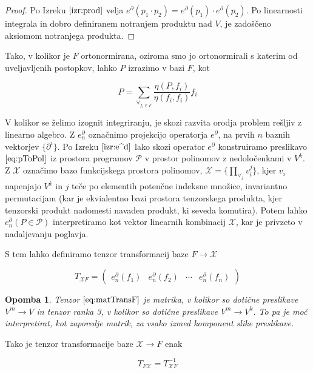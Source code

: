 \documentclass{article}
\newcommand{\X}{\mathcal{X}}
\newcommand{\dP}{\mathcal{P}}
\newcommand{\D}{\partial}
\newtheorem{opomba}{Opomba}[section]
\begin{document}
  \begin{proof}
  Po Izreku $\ref{izr:prod}$ velja $e^\D(p_1\cdot p_2)=e^\D(p_1)\cdot e^\D(p_2)$. Po linearnosti integrala in dobro definiranem notranjem produktu nad $V$, je zadoščeno aksiomom notranjega produkta.
  \end{proof}
  
  Tako, v kolikor je $F$ ortonormirana, oziroma smo jo ortonormirali s katerim od uveljavljenih postopkov, lahko $P$ izrazimo v bazi $F$, kot
  
  \begin{equation}
 	P=\sum\limits_{\forall_{f_i\in F}}\frac{\eta(P,f_i)}{\eta(f_i,f_i)}f_i
  \end{equation}
  
  V kolikor se želimo izognit integriranju, je skozi razvita orodja problem rešljiv z linearno algebro. Z $e_n^\D$ označnimo projekcijo operatorja $e^\D$, na prvih $n$ baznih vektorjev $\{\D^i\}$. Po Izreku $\ref{izr:e^d}$ lako skozi operator $e^\D$ konstruiramo preslikavo $\eqref{eq:pToPol}$ iz prostora programov $\dP$ v prostor polinomov z nedoločenkami v  $V^k$. Z $\X$ označimo bazo funkcijskega prostora polinomov, $\X=\{\prod\limits_{\forall_j} v_i^j\}$, kjer $v_i$ napenjajo $V^k$ in $j$ teče po elementih potenčne indeksne množice, invariantno permutacijam (kar je ekvialentno bazi prostora tenzorskega produkta, kjer tenzorski produkt nadomesti navaden produkt, ki seveda komutira). Potem lahko $e^\D_n(P\in\dP)$ interpretiramo kot vektor linearnih kombinacij $\X$, kar je privzeto v nadaljevanju poglavja.
  
  S tem lahko definiramo tenzor transformacij baze $F\to\X$
  
  \begin{equation}\label{eq:matTransF}
  T_{\X F}=\begin{pmatrix}
  e_n^\D(f_1) & e_n^\D(f_2) & \cdots & e_n^\D(f_n)
  \end{pmatrix}
  \end{equation}
  
  \begin{opomba}
  Tenzor $\eqref{eq:matTransF}$ je matrika, v kolikor so dotične preslikave $V^m\to V$ in tenzor ranka 3, v kolikor so dotične preslikave $V^m\to V^k$. To pa je moč interpretirat, kot zaporedje matrik, za vsako izmed komponent slike preslikave.
  \end{opomba}
  
  Tako je tenzor transformacije baze $\X\to F$ enak
  
  \begin{equation}\label{eq:matTrans}
  T_{F\X}=T_{\X F}^{-1}
  \end{equation}
    
\end{document}
